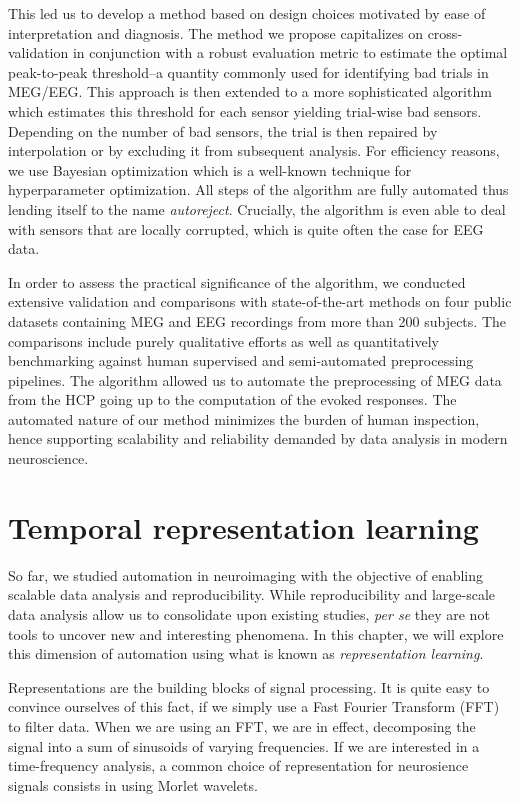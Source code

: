 This led us to develop a method based on design choices motivated by ease of interpretation and diagnosis. The method we propose capitalizes on cross-validation in conjunction with a robust evaluation metric to estimate the optimal peak-to-peak threshold--a quantity commonly used for identifying bad trials in \ac{MEG}/\ac{EEG}. This approach is then extended to a more sophisticated algorithm which estimates this threshold for each sensor yielding trial-wise bad sensors. Depending on the number of bad sensors, the trial is then repaired by interpolation or by excluding it from subsequent analysis. For efficiency reasons, we use Bayesian optimization which is a well-known technique for hyperparameter optimization. All steps of the algorithm are fully automated thus lending itself to the name \emph{autoreject}. Crucially, the algorithm is even able to deal with sensors that are locally corrupted, which is quite often the case for \ac{EEG} data.

In order to assess the practical significance of the algorithm, we conducted extensive validation and comparisons with state-of-the-art methods on four public datasets containing \ac{MEG} and \ac{EEG} recordings from more than 200 subjects. The comparisons include purely qualitative efforts as well as quantitatively benchmarking against human supervised and semi-automated preprocessing pipelines. The algorithm allowed us to automate the preprocessing of \ac{MEG} data from the \ac{HCP} going up to the computation of the evoked responses. The automated nature of our method minimizes the burden of human inspection, hence supporting scalability and reliability demanded by data analysis in modern neuroscience.

\clearpage
\section{Temporal representation learning}

So far, we studied automation in neuroimaging with the objective of enabling scalable data analysis and reproducibility. While  reproducibility and large-scale data analysis allow us to consolidate upon existing studies, \emph{per se} they are not tools to uncover new and interesting phenomena. In this chapter, we will explore this dimension of automation using what is known as \emph{representation learning}.

Representations are the building blocks of signal processing. It is quite easy to convince ourselves of this fact, if we simply use a Fast Fourier Transform (FFT) to filter data. When we are using an FFT, we are in effect, decomposing the signal into a sum of sinusoids of varying frequencies. If we are interested in a time-frequency analysis, a common choice of representation for neurosience signals consists in using Morlet wavelets.

